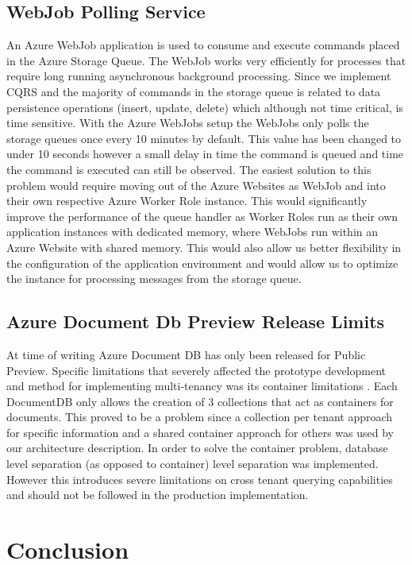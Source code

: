 \subsection{WebJob Polling Service}
An Azure WebJob application is used to consume and execute commands placed in the Azure Storage Queue. The WebJob works very efficiently for processes that require long running asynchronous background processing. Since we implement CQRS and the majority of commands in the storage queue is related to data persistence operations (insert, update, delete) which although not time critical, is time sensitive. With the Azure WebJobs setup the WebJobs only polls the storage queues once every 10 minutes by default. This value has been changed to under 10 seconds however a small delay in time the command is queued and time the command is executed can still be observed. The easiest solution to this problem would require moving out of the Azure Websites as WebJob and into their own respective Azure Worker Role instance. This would significantly improve the performance of the queue handler as Worker Roles run as their own application instances with dedicated memory, where WebJobs run within an Azure Website with shared memory. This would also allow us better flexibility in the configuration of the application environment and would allow us to optimize the instance for processing messages from the storage queue.

\subsection{Azure Document Db Preview Release Limits}
At time of writing Azure Document DB has only been released for Public Preview. Specific limitations that severely affected the prototype development and method for implementing multi-tenancy was its container limitations \cite{AzureLimits}. Each DocumentDB only allows the creation of 3 collections that act as containers for documents. This proved to be a problem since a collection per tenant approach for specific information and a shared container approach for others was used by our architecture description. In order to solve the container problem, database level separation (as opposed to container) level separation was implemented. However this introduces severe limitations on cross tenant querying capabilities and should not be followed in the production implementation.

\section{Conclusion}

